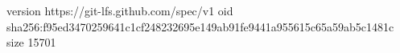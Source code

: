 version https://git-lfs.github.com/spec/v1
oid sha256:f95ed3470259641c1cf248232695e149ab91fe9441a955615c65a59ab5c1481c
size 15701
